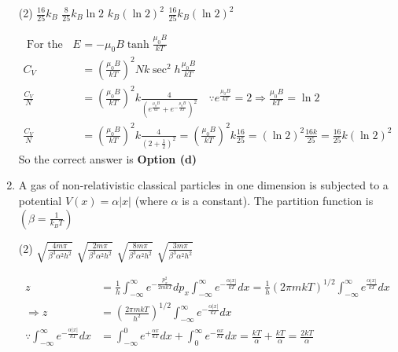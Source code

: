 \begin{enumerate}
 \begin{tasks}(2)
	\task[\textbf{a.}]$\frac{16}{25} k_{B}$
	\task[\textbf{b.}] $\frac{8}{25} k_{B} \ln 2$
	\task[\textbf{c.}]$k_{B}(\ln 2)^{2}$
	\task[\textbf{d.}]  $\frac{16}{25} k_{B}(\ln 2)^{2}$
\end{tasks}
\begin{answer}
	\begin{align*}
	\text {  For the given system } E&=-\mu_{0} B \tanh \frac{\mu_{0} B}{k T}\\
	C_{V}&=\left(\frac{\mu_{0} B}{k T}\right)^{2} N k \sec ^{2} h \frac{\mu_{0} B}{k T}\\
	\frac{C_{V}}{N}&=\left(\frac{\mu_{0} B}{k T}\right)^{2} k \frac{4}{\left(e^{\frac{\mu_{0} B}{k T}}+e^{-\frac{\mu_{0} B}{k T}}\right)^{2}} \quad \because e^{\frac{\mu_{0} B}{k T}}=2 \Rightarrow \frac{\mu_{0} B}{k T}=\ln 2\\
	\frac{C_{V}}{N}&=\left(\frac{\mu_{0} B}{k T}\right)^{2} k \frac{4}{\left(2+\frac{1}{2}\right)^{2}}=\left(\frac{\mu_{0} B}{k T}\right)^{2} k \frac{16}{25}=(\ln 2)^{2} \frac{16 k}{25}=\frac{16}{25} k(\ln 2)^{2}
	\end{align*}
	So the correct answer is \textbf{Option (d)}
\end{answer}
\item A gas of non-relativistic classical particles in one dimension is subjected to a potential $V(x)=\alpha|x|$ (where $\alpha$ is a constant). The partition function is $\left(\beta=\frac{1}{k_{B} T}\right)$
 \begin{tasks}(2)
	\task[\textbf{a.}] $\sqrt{\frac{4 m \pi}{\beta^{3} \alpha^{2} h^{2}}}$
	\task[\textbf{b.}] $\sqrt{\frac{2 m \pi}{\beta^{3} \alpha^{2} h^{2}}}$
	\task[\textbf{c.}]$\sqrt{\frac{8 m \pi}{\beta^{3} \alpha^{2} h^{2}}}$
	\task[\textbf{d.}] $\sqrt{\frac{3 m \pi}{\beta^{3} \alpha^{2} h^{2}}}$
\end{tasks}
\begin{answer}
	\begin{align*}
	z&=\frac{1}{h} \int_{-\infty}^{\infty} e^{-\frac{p_{x}^{2}}{2 m k T}} d p_{x} \int_{-\infty}^{\infty} e^{-\frac{\alpha|x|}{k T}} d x=\frac{1}{h}(2 \pi m k T)^{1 / 2} \int_{-\infty}^{\infty} e^{\frac{\alpha|x|}{k T}} d x\\
	\Rightarrow z&=\left(\frac{2 \pi m k T}{h^{2}}\right)^{1 / 2} \int_{-\infty}^{\infty} e^{-\frac{\alpha|x|}{k T}} d x\\
	\because \int_{-\infty}^{\infty} e^{-\frac{\alpha|x|}{k T}} d x&=\int_{-\infty}^{0} e^{+\frac{\alpha x}{k T}} d x+\int_{0}^{\infty} e^{-\frac{\alpha x}{k T}} d x=\frac{k T}{\alpha}+\frac{k T}{\alpha}=\frac{2 k T}{\alpha}\\

\end{align*}
\end{answer}
\end{enumerate}
